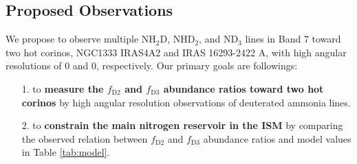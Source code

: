 \documentclass[12pt,a4paper]{article}  %
\newcommand{\ammonia}{NH$_3$\xspace}
\begin{document}




\subsection{Proposed Observations}
We propose to observe multiple NH$_2$D, NHD$_2$, and ND$_3$ lines in Band 7 toward two hot corinos, NGC1333 IRAS4A2 and IRAS 16293-2422 A, with high angular resolutions of 0 and 0, respectively. Our primary goals are followings:

\begin{enumerate}[leftmargin=*]
    \setlength\itemsep{-0.2em}
    
    \item[1.] to \textbf{measure the $f_\mathrm{D2}$ and $f_\mathrm{D3}$ abundance ratios toward two hot corinos} by high angular resolution observations of deuterated ammonia lines.
    
    \item[2.] to \textbf{constrain the main nitrogen reservoir in the ISM} by comparing the observed relation between $f_\mathrm{D2}$ and $f_\mathrm{D3}$ abundance ratios and model values in Table \ref{tab:model}.
    
\end{enumerate}
\end{document}
